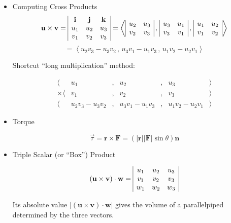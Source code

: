 \documentclass[12pt]{article}
\renewcommand{\vec}[1]{\mathbf{#1}}
\newcommand{\veci}{\mathbf{i}}
\newcommand{\vecj}{\mathbf{j}}
\newcommand{\veck}{\mathbf{k}}
\newcommand{\<}{\left<}
\renewcommand{\>}{\right>}
\begin{document}
\begin{itemize}
\begin{itemize}
      \end{itemize}
    \item Computing Cross Products
\[
    \vec{u} \times \vec{v} = 
\begin{array}{|c c c|}
\veci & \vecj & \veck \\
u_1 & u_2 & u_3 \\
v_1 & v_2 & v_3 \\
\end{array}
    =
    \<
\begin{array}{|c c|}
u_2 & u_3 \\
v_2 & v_3 \\
\end{array}
    \,,\,
\begin{array}{|c c|}
u_3 & u_1 \\
v_3 & v_1 \\
\end{array}
    \,,\,
\begin{array}{|c c|}
u_1 & u_2 \\
v_1 & v_2 \\
\end{array}
    \>
\]
    \[
    =
    \<u_2v_3-u_3v_2\,,\,u_3v_1-u_1v_3\,,\,u_1v_2-u_2v_1\>
    \]
    
    Shortcut ``long multiplication'' method:
    
    \[
\begin{array}{rcccccl}
\langle& u_1 & , & u_2 & , & u_3 & \rangle \\
\times\langle & v_1 & , & v_2 & , & v_3 & \rangle \\\hline
\langle & u_2v_3-u_3v_2 & , & u_3v_1-u_1v_3 & , & u_1v_2-u_2v_1 & \rangle
\end{array}
    \]
    
    \item Torque
    
    \[\overrightarrow{\tau} = \vec{r} \times \vec{F} = (|\vec{r}||\vec{F}|\sin \theta)\vec{n} \]
    
    \item Triple Scalar (or ``Box'') Product
    
    \[
    (\vec{u}\times\vec{v})\cdot\vec{w} =
    \begin{array}{|c c c|}
    u_1 & u_2 & u_3 \\
    v_1 & v_2 & v_3 \\
    w_1 & w_2 & w_3 \\
    \end{array}
    \]
    
    Its absolute value $|(\vec{u}\times\vec{v})\cdot\vec{w}|$ gives the volume of a parallelpiped determined by the three vectors.
    

\end{itemize}
\end{document}
